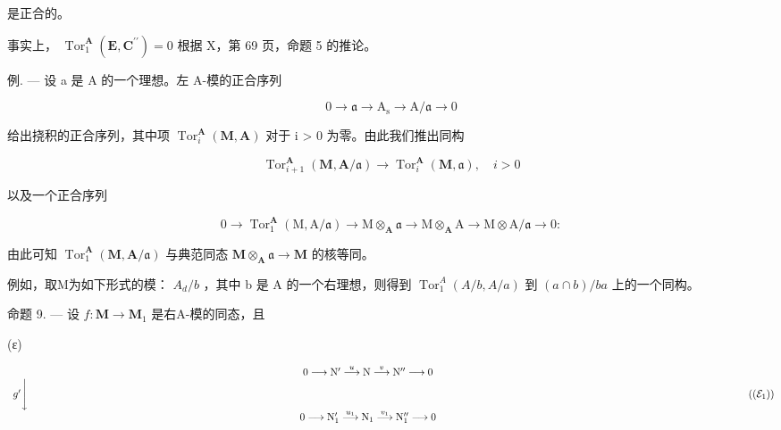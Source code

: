 是正合的。

事实上， \(\operatorname{Tor}_1^{\mathbf{A}}(\mathbf{E},\mathbf{C}^{\prime \prime}) = 0\) 根据 X，第 69 页，命题 5 的推论。

例. --- 设 a 是 A 的一个理想。左 A-模的正合序列

\[
0 \rightarrow \mathfrak {a} \rightarrow \mathrm{A} _ {\mathrm{s}} \rightarrow \mathrm{A} / \mathfrak {a} \rightarrow 0
\]

给出挠积的正合序列，其中项 \(\operatorname{Tor}_{i}^{\mathbf{A}}(\mathbf{M},\mathbf{A})\) 对于 i \textgreater{} 0 为零。由此我们推出同构

\[
\operatorname{Tor} _ {i + 1} ^ {\mathbf {A}} (\mathbf {M}, \mathbf {A} / \mathfrak {a}) \rightarrow \operatorname{Tor} _ {i} ^ {\mathbf {A}} (\mathbf {M}, \mathfrak {a}), \quad i > 0
\]

以及一个正合序列

\[
0 \rightarrow \operatorname{Tor} _ {1} ^ {\mathbf {A}} (\mathrm{M}, \mathrm{A} / \mathfrak {a}) \rightarrow \mathrm{M} \otimes_ {\mathbf {A}} \mathfrak {a} \rightarrow \mathrm{M} \otimes_ {\mathbf {A}} \mathrm{A} \rightarrow \mathrm{M} \otimes \mathrm{A} / \mathfrak {a} \rightarrow 0:
\]

由此可知 \(\operatorname{Tor}_{1}^{\mathbf{A}}(\mathbf{M},\mathbf{A}/\mathfrak{a})\) 与典范同态 \(\mathbf{M}\otimes_{\mathbf{A}}\mathfrak{a}\to\mathbf{M}\) 的核等同。

例如，取M为如下形式的模： \(A_{d}/b\) ，其中 b 是 A 的一个右理想，则得到 \(\operatorname{Tor}_{1}^{A}(A/b, A/a)\) 到 \((a \cap b)/ba\) 上的一个同构。

命题 9. --- 设 \(f: \mathbf{M} \to \mathbf{M}_{1}\) 是右A-模的同态，且

(ε)

\[
\begin{array}{c} 0 \longrightarrow \mathrm{N} ^ {\prime} \stackrel {{u}} {{\longrightarrow}} \mathrm{N} \stackrel {{v}} {{\longrightarrow}} \mathrm{N} ^ {\prime \prime} \longrightarrow 0 \\ g ^ {\prime} \Biggl \downarrow \qquad \qquad \qquad \qquad \qquad \qquad \qquad \qquad \qquad \qquad \qquad \qquad \qquad \qquad \qquad \qquad \qquad \qquad \qquad \qquad \qquad \qquad \qquad \qquad \qquad \qquad \qquad \qquad \qquad \qquad \qquad \qquad \qquad \qquad \\ 0 \longrightarrow \mathrm{N} _ {1} ^ {\prime} \stackrel {{u _ {1}}} {{\longrightarrow}} \mathrm{N} _ {1} \stackrel {{v _ {1}}} {{\longrightarrow}} \mathrm{N} _ {1} ^ {\prime \prime} \longrightarrow 0 \end{array}\tag{$(\mathcal{E}_1)$}
\]

